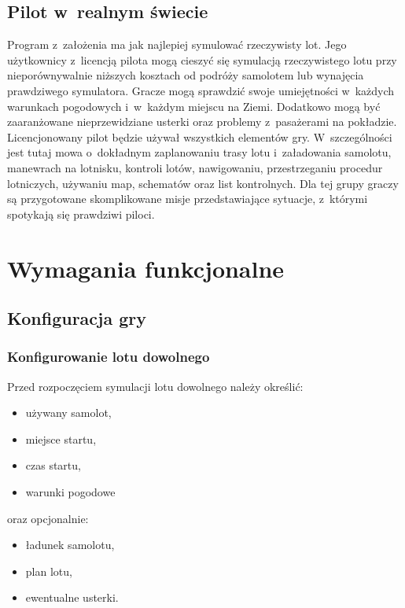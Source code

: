 \documentclass{mwrep}
\begin{document}
\section{Pilot w~realnym świecie}

Program z~założenia ma jak najlepiej symulować rzeczywisty lot. Jego użytkownicy z~licencją pilota mogą cieszyć się symulacją rzeczywistego lotu przy nieporównywalnie niższych kosztach od podróży samolotem lub wynajęcia prawdziwego symulatora. Gracze mogą sprawdzić swoje umiejętności w~każdych warunkach pogodowych i~w~każdym miejscu na Ziemi. Dodatkowo mogą być zaaranżowane nieprzewidziane usterki oraz problemy z~pasażerami na pokładzie. Licencjonowany pilot będzie używał wszystkich elementów gry. W~szczególności jest tutaj mowa o~dokładnym zaplanowaniu trasy lotu i~załadowania samolotu, manewrach na lotnisku, kontroli lotów, nawigowaniu, przestrzeganiu procedur lotniczych, używaniu map, schematów oraz list kontrolnych. Dla tej grupy graczy są przygotowane skomplikowane misje przedstawiające sytuacje, z~którymi spotykają się prawdziwi piloci.

\chapter{Wymagania funkcjonalne}

\section{Konfiguracja gry}

\subsection{Konfigurowanie lotu dowolnego}

Przed rozpoczęciem symulacji lotu dowolnego należy określić:
\begin{itemize}
\item używany samolot,
\item miejsce startu,
\item czas startu,
\item warunki pogodowe
\end{itemize}
oraz opcjonalnie:
\begin{itemize}
\item ładunek samolotu,
\item plan lotu,
\item ewentualne usterki.
\end{itemize}
\end{document}
